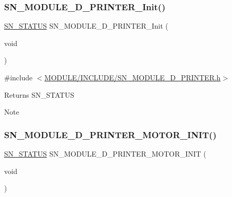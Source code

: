 \subsubsection{\texorpdfstring{S\+N\+\_\+\+M\+O\+D\+U\+L\+E\+\_\+D\+\_\+\+P\+R\+I\+N\+T\+E\+R\+\_\+\+Init()}{SN\_MODULE\_3D\_PRINTER\_Init()}}
{\footnotesize\ttfamily \hyperlink{group__SYSTEM__ERROR_ga4540713b9a7a18ce44d78c3a10f7442f}{S\+N\+\_\+\+S\+T\+A\+T\+US} S\+N\+\_\+\+M\+O\+D\+U\+L\+E\+\_\+D\+\_\+\+P\+R\+I\+N\+T\+E\+R\+\_\+\+Init (\begin{DoxyParamCaption}\item[{void}]{ }\end{DoxyParamCaption})}



{\ttfamily \#include $<$\hyperlink{SN__MODULE__3D__PRINTER_8h}{M\+O\+D\+U\+L\+E/\+I\+N\+C\+L\+U\+D\+E/\+S\+N\+\_\+\+M\+O\+D\+U\+L\+E\+\_\+D\+\_\+\+P\+R\+I\+N\+T\+E\+R.\+h}$>$}

\begin{DoxyReturn}{Returns}
S\+N\+\_\+\+S\+T\+A\+T\+US
\end{DoxyReturn}
\begin{DoxyNote}{Note}

\end{DoxyNote}
\mbox{\label{group__MODULE__3D__PRINTER_gafc569784fa8758bec7c2f90b1a7f1404}} 
\subsubsection{\texorpdfstring{S\+N\+\_\+\+M\+O\+D\+U\+L\+E\+\_\+D\+\_\+\+P\+R\+I\+N\+T\+E\+R\+\_\+\+M\+O\+T\+O\+R\+\_\+\+I\+N\+I\+T()}{SN\_MODULE\_3D\_PRINTER\_MOTOR\_INIT()}}
{\footnotesize\ttfamily \hyperlink{group__SYSTEM__ERROR_ga4540713b9a7a18ce44d78c3a10f7442f}{S\+N\+\_\+\+S\+T\+A\+T\+US} S\+N\+\_\+\+M\+O\+D\+U\+L\+E\+\_\+D\+\_\+\+P\+R\+I\+N\+T\+E\+R\+\_\+\+M\+O\+T\+O\+R\+\_\+\+I\+N\+IT (\begin{DoxyParamCaption}\item[{void}]{ }\end{DoxyParamCaption})}



